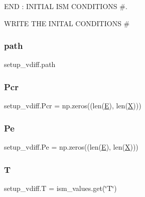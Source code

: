 E\+ND \+: I\+N\+I\+T\+I\+AL I\+SM C\+O\+N\+D\+I\+T\+I\+O\+NS \#. 

W\+R\+I\+TE T\+HE I\+N\+I\+T\+AL C\+O\+N\+D\+I\+T\+I\+O\+NS \# \mbox{\label{namespacesetup__vdiff_a3ddcea8137546394c8342e42b81a505e}} 
\subsubsection{\texorpdfstring{path}{path}}
{\footnotesize\ttfamily setup\+\_\+vdiff.\+path}

\mbox{\label{namespacesetup__vdiff_a0b7b3be5a33c6732d5545a373f6aa29d}} 
\subsubsection{\texorpdfstring{Pcr}{Pcr}}
{\footnotesize\ttfamily setup\+\_\+vdiff.\+Pcr = np.\+zeros((len(\hyperlink{namespacesetup__vdiff_a7780682c76ff3896106f4045b64e582a}{E}), len(\hyperlink{namespacesetup__vdiff_a2d0381db5d912bb072d7cfa7c997de97}{X})))}

\mbox{\label{namespacesetup__vdiff_a582f216db715ff78bb612a997fdb3bf5}} 
\subsubsection{\texorpdfstring{Pe}{Pe}}
{\footnotesize\ttfamily setup\+\_\+vdiff.\+Pe = np.\+zeros((len(\hyperlink{namespacesetup__vdiff_a7780682c76ff3896106f4045b64e582a}{E}), len(\hyperlink{namespacesetup__vdiff_a2d0381db5d912bb072d7cfa7c997de97}{X})))}

\mbox{\label{namespacesetup__vdiff_a9c24441c84453bbc2ef54bcee83fefba}} 
\subsubsection{\texorpdfstring{T}{T}}
{\footnotesize\ttfamily setup\+\_\+vdiff.\+T = ism\+\_\+values.\+get(\char`\"{}T\char`\"{})}


